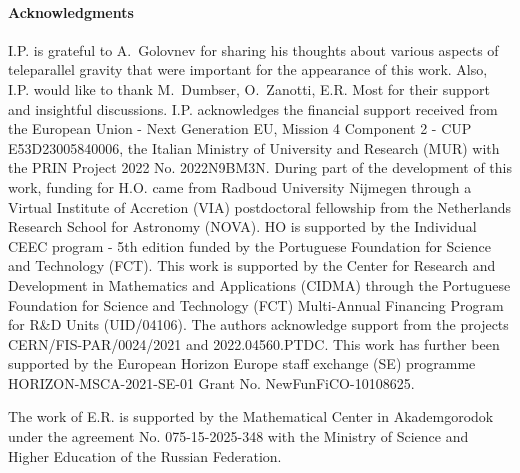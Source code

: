 \documentclass[
10pt, %
a4paper, %
oneside, %
twocolumn,
headinclude,footinclude, %
BCOR5mm, %
]{scrartcl}
\begin{document}
	\paragraph{Acknowledgments}
	I.P. is grateful to A.~Golovnev for sharing his thoughts about various
	aspects of teleparallel gravity that were important for the appearance of
	this work. Also, I.P. would like to thank M.~Dumbser, O.~Zanotti, E.R. Most
	for their support and insightful discussions. I.P. acknowledges the
	financial support received from the European Union - Next Generation EU,
	Mission 4 Component 2 - CUP E53D23005840006, the Italian Ministry of
	University and Research (MUR) with the PRIN Project 2022 No. 2022N9BM3N.
	During part of the development of this work,
	funding for H.O. came from Radboud University Nijmegen through a Virtual
	Institute of Accretion (VIA) postdoctoral fellowship from the Netherlands
	Research School for Astronomy (NOVA).
	HO is supported by the Individual CEEC program - 5th edition funded by
	the Portuguese Foundation for Science and Technology (FCT). This work is
	supported by the Center for Research and Development in Mathematics and
	Applications (CIDMA) through the Portuguese Foundation for Science and
	Technology (FCT) Multi-Annual Financing Program for R\&D Units (UID/04106).
	The authors acknowledge support from the projects
	CERN/FIS-PAR/0024/2021 and 2022.04560.PTDC. This work has further been
	supported by the  European Horizon Europe staff exchange (SE) programme
	HORIZON-MSCA-2021-SE-01 Grant No. NewFunFiCO-10108625.


	The work of E.R. is supported by the Mathematical Center in Akademgorodok
	under the agreement No. 075-15-2025-348 with the Ministry of Science and
	Higher Education of the Russian Federation.
	
	
	\appendix
	
\end{document}
